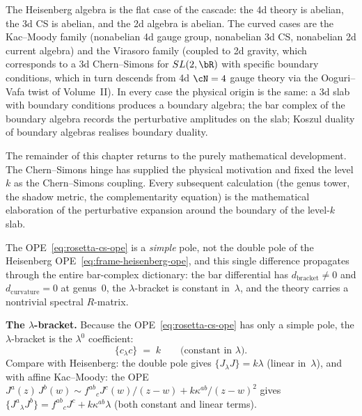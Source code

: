 The Heisenberg algebra is the flat case of the cascade: the 4d
theory is abelian, the 3d CS is abelian, and the 2d algebra is
abelian. The curved cases are the Kac--Moody family (nonabelian
4d gauge group, nonabelian 3d CS, nonabelian 2d current algebra)
and the Virasoro family (coupled to 2d gravity, which corresponds
to a 3d Chern--Simons for $SL(2,\bR)$ with specific boundary
conditions, which in turn descends from 4d $\cN = 4$ gauge theory
via the Ooguri--Vafa twist of Volume~II). In every case the
physical origin is the same: a 3d slab with boundary conditions
produces a boundary algebra; the bar complex of the boundary
algebra records the perturbative amplitudes on the slab; Koszul
duality of boundary algebras realises boundary duality.

\medskip
\noindent
The remainder of this chapter returns to the purely mathematical
development. The Chern--Simons hinge has supplied the physical
motivation and fixed the level $k$ as the Chern--Simons coupling.
Every subsequent calculation (the genus tower, the shadow metric,
the complementarity equation) is the mathematical elaboration of
the perturbative expansion around the boundary of the
level-$k$ slab.

The OPE~\eqref{eq:rosetta-cs-ope} is a \emph{simple} pole,
not the double pole of the Heisenberg
OPE~\eqref{eq:frame-heisenberg-ope}, and this single difference
propagates through the entire bar-complex dictionary: the bar
differential has $d_{\mathrm{bracket}} \neq 0$ and
$d_{\mathrm{curvature}} = 0$ at genus~$0$, the $\lambda$-bracket is
constant in~$\lambda$, and the theory carries a nontrivial spectral
$R$-matrix.

\medskip
\noindent\textbf{The $\lambda$-bracket.}\enspace
Because the OPE~\eqref{eq:rosetta-cs-ope} has only a simple pole,
the $\lambda$-bracket is the $\lambda^0$ coefficient:
\begin{equation}\label{eq:rosetta-cs-lambda-bracket}
\{c {}_\lambda c\} \;=\; k
\qquad
\text{(constant in $\lambda$)}.
\end{equation}
Compare with Heisenberg: the double pole gives
$\{J {}_\lambda J\} = k\lambda$ (linear in~$\lambda$), and with
affine Kac--Moody: the OPE $J^a(z)\,J^b(w) \sim
f^{ab}{}_c J^c(w)/(z-w) + k\kappa^{ab}/(z-w)^2$ gives
$\{J^a {}_\lambda J^b\} = f^{ab}{}_c J^c + k\kappa^{ab}\lambda$
(both constant and linear terms).

